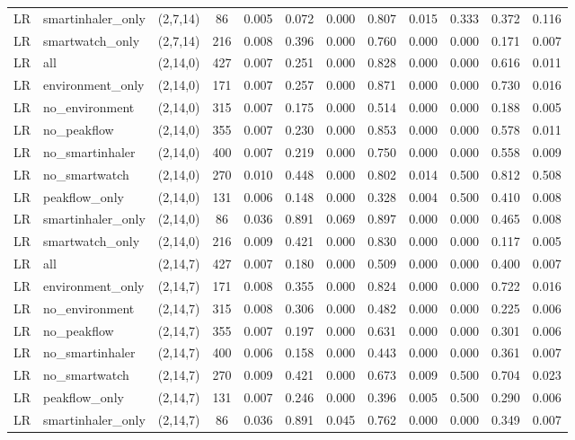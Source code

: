 \begin{longtable}{llcccccccccc}
LR & smartinhaler\_only & (2,7,14) & 86 & 0.005 & 0.072 & 0.000 & 0.807 & 0.015 & 0.333 & 0.372 & 0.116 \\
LR & smartwatch\_only & (2,7,14) & 216 & 0.008 & 0.396 & 0.000 & 0.760 & 0.000 & 0.000 & 0.171 & 0.007 \\
LR & all & (2,14,0) & 427 & 0.007 & 0.251 & 0.000 & 0.828 & 0.000 & 0.000 & 0.616 & 0.011 \\
LR & environment\_only & (2,14,0) & 171 & 0.007 & 0.257 & 0.000 & 0.871 & 0.000 & 0.000 & 0.730 & 0.016 \\
LR & no\_environment & (2,14,0) & 315 & 0.007 & 0.175 & 0.000 & 0.514 & 0.000 & 0.000 & 0.188 & 0.005 \\
LR & no\_peakflow & (2,14,0) & 355 & 0.007 & 0.230 & 0.000 & 0.853 & 0.000 & 0.000 & 0.578 & 0.011 \\
LR & no\_smartinhaler & (2,14,0) & 400 & 0.007 & 0.219 & 0.000 & 0.750 & 0.000 & 0.000 & 0.558 & 0.009 \\
LR & no\_smartwatch & (2,14,0) & 270 & 0.010 & 0.448 & 0.000 & 0.802 & 0.014 & 0.500 & 0.812 & 0.508 \\
LR & peakflow\_only & (2,14,0) & 131 & 0.006 & 0.148 & 0.000 & 0.328 & 0.004 & 0.500 & 0.410 & 0.008 \\
LR & smartinhaler\_only & (2,14,0) & 86 & 0.036 & 0.891 & 0.069 & 0.897 & 0.000 & 0.000 & 0.465 & 0.008 \\
LR & smartwatch\_only & (2,14,0) & 216 & 0.009 & 0.421 & 0.000 & 0.830 & 0.000 & 0.000 & 0.117 & 0.005 \\
LR & all & (2,14,7) & 427 & 0.007 & 0.180 & 0.000 & 0.509 & 0.000 & 0.000 & 0.400 & 0.007 \\
LR & environment\_only & (2,14,7) & 171 & 0.008 & 0.355 & 0.000 & 0.824 & 0.000 & 0.000 & 0.722 & 0.016 \\
LR & no\_environment & (2,14,7) & 315 & 0.008 & 0.306 & 0.000 & 0.482 & 0.000 & 0.000 & 0.225 & 0.006 \\
LR & no\_peakflow & (2,14,7) & 355 & 0.007 & 0.197 & 0.000 & 0.631 & 0.000 & 0.000 & 0.301 & 0.006 \\
LR & no\_smartinhaler & (2,14,7) & 400 & 0.006 & 0.158 & 0.000 & 0.443 & 0.000 & 0.000 & 0.361 & 0.007 \\
LR & no\_smartwatch & (2,14,7) & 270 & 0.009 & 0.421 & 0.000 & 0.673 & 0.009 & 0.500 & 0.704 & 0.023 \\
LR & peakflow\_only & (2,14,7) & 131 & 0.007 & 0.246 & 0.000 & 0.396 & 0.005 & 0.500 & 0.290 & 0.006 \\
LR & smartinhaler\_only & (2,14,7) & 86 & 0.036 & 0.891 & 0.045 & 0.762 & 0.000 & 0.000 & 0.349 & 0.007 \\

\end{longtable}
